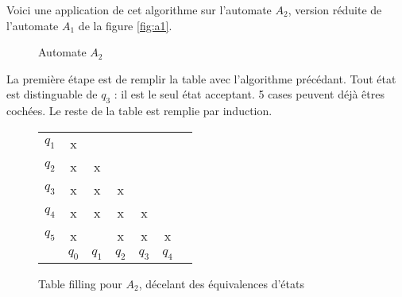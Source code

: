 \begin{example} Voici une application de cet algorithme sur l'automate $A_2$, version réduite de l'automate $A_1$ de la figure \ref{fig:a1}.

\begin{figure}[H]
 \centering
 \caption{Automate $A_2$}\label{fig:a2}
\end{figure}

La première étape est de remplir la table avec l'algorithme précédant. Tout état est distinguable de $q_3$ : il est le seul état acceptant. 5 cases peuvent déjà êtres cochées. Le reste de la table est remplie par induction.

\begin{figure}[H]
 \centering
 \begin{tabular}{ccccccc}
	 \cline{2-2}
	 \multicolumn{1}{c|}{$q_1$} & \multicolumn{1}{c|}{x} &&&&\\
	 \cline{2-3}
	 \multicolumn{1}{c|}{$q_2$} & \multicolumn{1}{c|}{x} &\multicolumn{1}{c|}{x}&&&\\
	 \cline{2-4}
	 \multicolumn{1}{c|}{$q_3$} & \multicolumn{1}{c|}{x} &\multicolumn{1}{c|}{x}&\multicolumn{1}{c|}{x}&&\\
	 \cline{2-5}
	 \multicolumn{1}{c|}{$q_4$} & \multicolumn{1}{c|}{x} &\multicolumn{1}{c|}{x}&\multicolumn{1}{c|}{x}&\multicolumn{1}{c|}{x}&\\
	 \cline{2-6}
	 \multicolumn{1}{c|}{$q_5$} & \multicolumn{1}{c|}{x} & \multicolumn{1}{c|}{}&\multicolumn{1}{c|}{x}&\multicolumn{1}{c|}{x}&\multicolumn{1}{c|}{x}\\
	 \cline{2-6}
	 \multicolumn{1}{c}{} & $q_0$&$q_1$&$q_2$&$q_3$&$q_4$\\

 \end{tabular}
 \caption{Table filling pour $A_2$, décelant des équivalences d'états}
 \label{fig:ta2}
\end{figure}
\end{example}
